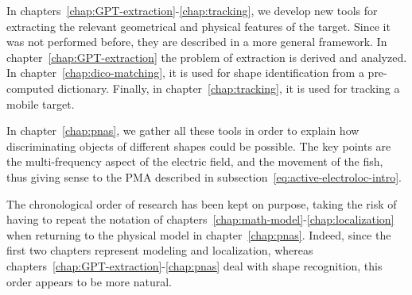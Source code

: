 In chapters~\ref{chap:GPT-extraction}-\ref{chap:tracking}, we develop new
tools for extracting the relevant geometrical and physical features of the target.
Since it was not performed before, they are described in a more general framework.
In chapter~\ref{chap:GPT-extraction} the problem of extraction is derived and 
analyzed. In chapter~\ref{chap:dico-matching}, it is used for shape identification
from a pre-computed dictionary. Finally, in chapter~\ref{chap:tracking}, it is
used for tracking a mobile target.

In chapter~\ref{chap:pnas}, we gather all these tools in order to explain how
discriminating objects of different shapes could be possible. The key points
are the multi-frequency aspect of the electric field, and the movement of the fish,
thus giving sense to the PMA described in subsection~\ref{eq:active-electroloc-intro}.

The chronological order of research has been kept on purpose, taking the risk of
having to repeat the notation of chapters~\ref{chap:math-model}-\ref{chap:localization}
when returning to the physical model in chapter~\ref{chap:pnas}. Indeed, since
the first two chapters represent modeling and localization, whereas
chapters~\ref{chap:GPT-extraction}-\ref{chap:pnas} deal with shape recognition,
this order appears to be more natural.









